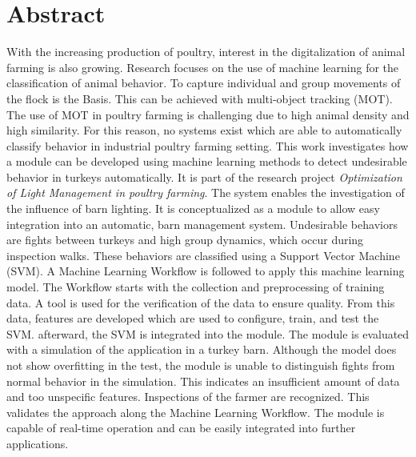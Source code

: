 \section*{Abstract}
\vspace*{-5mm}
With the increasing production of poultry, interest in the digitalization of animal farming is also growing. Research focuses on the use of machine learning for the classification of animal behavior. To capture individual and group movements of the flock is the Basis. This can be achieved with multi-object tracking (MOT). The use of MOT in poultry farming is challenging due to high animal density and high similarity. For this reason, no systems exist which are able to automatically classify behavior in industrial poultry farming setting. This work investigates how a module can be developed using machine learning methods to detect undesirable behavior in turkeys automatically. It is part of the research project \textit{Optimization of Light Management in poultry farming}. The system enables the investigation of the influence of barn lighting. It is conceptualized as a module to allow easy integration into an automatic, barn management system. Undesirable behaviors are fights between turkeys and high group dynamics, which occur during inspection walks. These behaviors are classified using a Support Vector Machine (SVM). A Machine Learning Workflow is followed to apply this machine learning model. The Workflow starts with the collection and preprocessing of training data. A tool is used for the verification of the data to ensure quality. From this data, features are developed which are used to  configure, train, and test the SVM. afterward, the SVM is integrated into the module. The module is evaluated with a simulation of the application in a turkey barn. Although the model does not show overfitting in the test, the module is unable to distinguish fights from normal behavior in the simulation. This indicates an insufficient amount of data and too unspecific features. Inspections of the farmer are recognized. This validates the approach along the Machine Learning Workflow. The module is capable of real-time operation and can be easily integrated into further applications.


